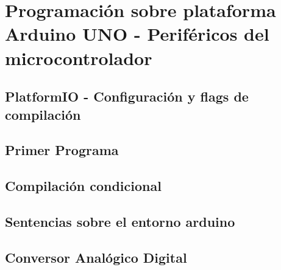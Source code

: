\chapter{Programación sobre plataforma Arduino UNO - Periféricos del microcontrolador} \label{ap:ard_uno_env}
\section{PlatformIO - Configuración y flags de compilación}
\section{Primer Programa}
\section{Compilación condicional}
\section{Sentencias sobre el entorno arduino}
\section{Conversor Analógico Digital}